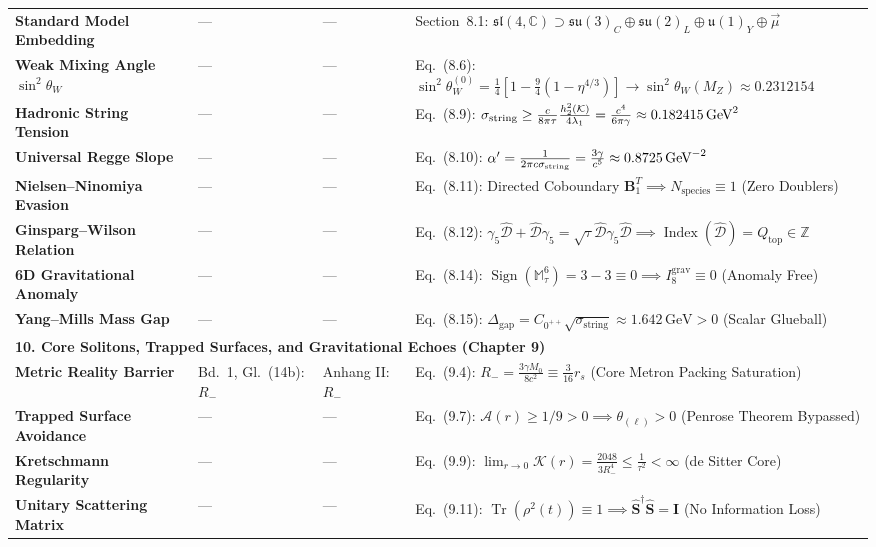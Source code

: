 \documentclass[
    12pt,
    a4paper,
    headings=normal,
    twoside=false,
    open=any,
    parskip=half
]{scrbook}
\let\hbar\relax
\begin{document}
\begin{longtable}{p{3.4cm}p{3.2cm}p{3.2cm}p{5.4cm}}
\textbf{Standard Model Embedding} & — & — & Section~8.1: $\mathfrak{sl}(4,\mathbb{C}) \supset \mathfrak{su}(3)_C \oplus \mathfrak{su}(2)_L \oplus \mathfrak{u}(1)_Y \oplus \vec{\mu}$ \\
\textbf{Weak Mixing Angle $\sin^2\theta_W$} & — & — & Eq.~(8.6): $\sin^2\theta_W^{(0)} = \frac{1}{4}[1 - \frac{9}{4}(1-\eta^{4/3})] \to \sin^2\theta_W(M_Z) \approx 0.2312154$ \\
\textbf{Hadronic String Tension} & — & — & Eq.~(8.9): $\sigma_{\text{string}} \ge \frac{\hbar c}{8\pi\tau}\frac{h_2^2(\mathcal{K})}{4\lambda_1} = \frac{c^4}{6\pi\gamma} \approx 0.182415\,\text{GeV}^2$ \\
\textbf{Universal Regge Slope} & — & — & Eq.~(8.10): $\alpha' = \frac{1}{2\pi\hbar c \sigma_{\text{string}}} = \frac{3\gamma}{c^5} \approx 0.8725\,\text{GeV}^{-2}$ \\
\textbf{Nielsen--Ninomiya Evasion} & — & — & Eq.~(8.11): Directed Coboundary $\mathbf{B}_1^T \implies N_{\text{species}} \equiv 1$ (Zero Doublers) \\
\textbf{Ginsparg--Wilson Relation} & — & — & Eq.~(8.12): $\gamma_5\hat{\mathcal{D}} + \hat{\mathcal{D}}\gamma_5 = \sqrt{\tau}\hat{\mathcal{D}}\gamma_5\hat{\mathcal{D}} \implies \operatorname{Index}(\hat{\mathcal{D}}) = Q_{\text{top}} \in \mathbb{Z}$ \\
\textbf{6D Gravitational Anomaly} & — & — & Eq.~(8.14): $\operatorname{Sign}(\mathbb{M}_\tau^6) = 3 - 3 \equiv 0 \implies I_8^{\text{grav}} \equiv 0$ (Anomaly Free) \\
\textbf{Yang--Mills Mass Gap} & — & — & Eq.~(8.15): $\Delta_{\text{gap}} = C_{0^{++}}\sqrt{\sigma_{\text{string}}} \approx 1.642\,\text{GeV} > 0$ (Scalar Glueball) \\\midrule
\multicolumn{4}{l}{\textsf{\textbf{\color{maincolor!90!black}10. Core Solitons, Trapped Surfaces, and Gravitational Echoes (Chapter 9)}}} \\\midrule
\textbf{Metric Reality Barrier} & Bd.~1, Gl.~(14b): $R_-$ & Anhang II: $R_-$ & Eq.~(9.4): $R_- = \frac{3\gamma M_0}{8c^2} \equiv \frac{3}{16}r_s$ (Core Metron Packing Saturation) \\
\textbf{Trapped Surface Avoidance} & — & — & Eq.~(9.7): $\mathcal{A}(r) \ge 1/9 > 0 \implies \theta_{(\ell)} > 0$ (Penrose Theorem Bypassed) \\
\textbf{Kretschmann Regularity} & — & — & Eq.~(9.9): $\lim_{r\to 0}\mathcal{K}(r) = \frac{2048}{3R_-^4} \le \frac{1}{\tau^2} < \infty$ (de Sitter Core) \\
\textbf{Unitary Scattering Matrix} & — & — & Eq.~(9.11): $\operatorname{Tr}(\rho^2(t)) \equiv 1 \implies \hat{\mathbf{S}}^\dagger\hat{\mathbf{S}} = \mathbf{I}$ (No Information Loss) \\

\end{longtable}
\end{document}
